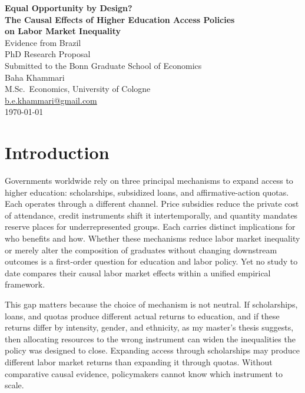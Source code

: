 \documentclass[a4paper,11pt]{article}
\begin{document}
\begin{center}
\vspace*{1cm}
{\LARGE \textbf{Equal Opportunity by Design?}} \\[8pt]
{\Large \textbf{The Causal Effects of Higher Education Access Policies}} \\[4pt]
{\Large \textbf{on Labor Market Inequality}} \\[8pt]
{\large Evidence from Brazil} \\[24pt]
{\large PhD Research Proposal} \\[4pt]
{\large Submitted to the Bonn Graduate School of Economics} \\[16pt]
{\large Baha Khammari} \\[4pt]
M.Sc.\ Economics, University of Cologne \\
\href{mailto:b.e.khammari@gmail.com}{b.e.khammari@gmail.com} \\[4pt]
\today
\end{center}

\vspace{24pt}

\section{Introduction}

Governments worldwide rely on three principal mechanisms to expand access to higher education: scholarships, subsidized loans, and affirmative-action quotas. Each operates through a different channel. Price subsidies reduce the private cost of attendance, credit instruments shift it intertemporally, and quantity mandates reserve places for underrepresented groups. Each carries distinct implications for who benefits and how. Whether these mechanisms reduce labor market inequality or merely alter the composition of graduates without changing downstream outcomes is a first-order question for education and labor policy. Yet no study to date compares their causal labor market effects within a unified empirical framework.

This gap matters because the choice of mechanism is not neutral. If scholarships, loans, and quotas produce different actual returns to education, and if these returns differ by intensity, gender, and ethnicity, as my master's thesis suggests, then allocating resources to the wrong instrument can widen the inequalities the policy was designed to close. Expanding access through scholarships may produce different labor market returns than expanding it through quotas. Without comparative causal evidence, policymakers cannot know which instrument to scale.
\end{document}

